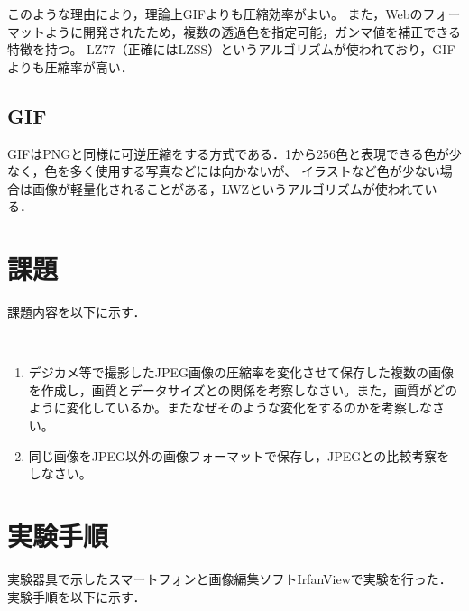 \documentclass[a4paper,11pt]{bxjsarticle}
\begin{document}
このような理由により，理論上GIFよりも圧縮効率がよい。
また，Webのフォーマットように開発されたため，複数の透過色を指定可能，ガンマ値を補正できる特徴を持つ。
LZ77（正確にはLZSS）というアルゴリズムが使われており，GIFよりも圧縮率が高い．

 
\subsection{GIF}
GIFはPNGと同様に可逆圧縮をする方式である．1から256色と表現できる色が少なく，色を多く使用する写真などには向かないが、
イラストなど色が少ない場合は画像が軽量化されることがある，LWZというアルゴリズムが使われている．

\section{課題}
課題内容を以下に示す．

　\begin{enumerate}
    \item デジカメ等で撮影したJPEG画像の圧縮率を変化させて保存した複数の画像を作成し，画質とデータサイズとの関係を考察しなさい。また，画質がどのように変化しているか。またなぜそのような変化をするのかを考察しなさい。
    \item 同じ画像をJPEG以外の画像フォーマットで保存し，JPEGとの比較考察をしなさい。
  \end{enumerate}



\section{実験手順}
実験器具で示したスマートフォンと画像編集ソフトIrfanViewで実験を行った．
実験手順を以下に示す．\\
\end{document}
